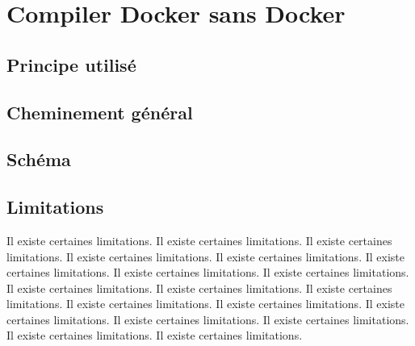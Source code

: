 \documentclass[11pt,a4paper,oneside]{article}
\begin{document}
\section{Compiler Docker sans Docker}

\subsection{Principe utilisé}

\subsection{Cheminement général}

\subsection{Schéma}

\subsection{Limitations}

Il existe certaines limitations.
Il existe certaines limitations.
Il existe certaines limitations.
Il existe certaines limitations.
Il existe certaines limitations.
Il existe certaines limitations.
Il existe certaines limitations.
Il existe certaines limitations.
Il existe certaines limitations.
Il existe certaines limitations.
Il existe certaines limitations.
Il existe certaines limitations.
Il existe certaines limitations.
Il existe certaines limitations.
Il existe certaines limitations.
Il existe certaines limitations.
Il existe certaines limitations.
Il existe certaines limitations.
\end{document}

